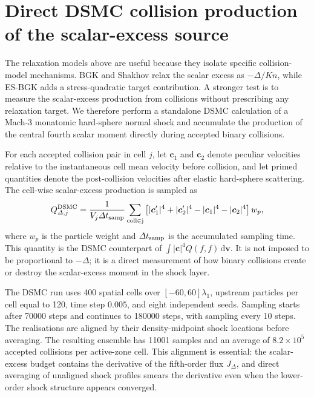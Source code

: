 \documentclass[lineno,paper]{JFM-FLM_Au}
\newcommand{\Kn}{\mathit{Kn}}
\newcommand{\dd}{\mathrm{d}}
\begin{document}
\section{Direct DSMC collision production of the scalar-excess source}
\label{sec:dsmc}

The relaxation models above are useful because they isolate specific collision-model mechanisms.  BGK and Shakhov relax the scalar excess as $-\Delta/\Kn$, while ES-BGK adds a stress-quadratic target contribution.  A stronger test is to measure the scalar-excess production from collisions without prescribing any relaxation target.  We therefore perform a standalone DSMC calculation of a Mach-3 monatomic hard-sphere normal shock and accumulate the production of the central fourth scalar moment directly during accepted binary collisions.

For each accepted collision pair in cell $j$, let $\boldsymbol c_1$ and $\boldsymbol c_2$ denote peculiar velocities relative to the instantaneous cell mean velocity before collision, and let primed quantities denote the post-collision velocities after elastic hard-sphere scattering.  The cell-wise scalar-excess production is sampled as
\begin{equation}
  Q_{\Delta,j}^{\rm DSMC}
  =\frac{1}{V_j\Delta t_{\rm samp}}
  \sum_{\rm coll\in j}
  \left[
  |\boldsymbol c'_1|^4+|\boldsymbol c'_2|^4
  -|\boldsymbol c_1|^4-|\boldsymbol c_2|^4
  \right]w_p,
  \label{eq:dsmc_qdelta}
\end{equation}
where $w_p$ is the particle weight and $\Delta t_{\rm samp}$ is the accumulated sampling time.  This quantity is the DSMC counterpart of $\int |\boldsymbol c|^4Q(f,f)\,\dd\boldsymbol v$.  It is not imposed to be proportional to $-\Delta$; it is a direct measurement of how binary collisions create or destroy the scalar-excess moment in the shock layer.

The DSMC run uses 400 spatial cells over $[-60,60]\lambda_1$, upstream particles per cell equal to 120, time step $0.005$, and eight independent seeds.  Sampling starts after 70000 steps and continues to 180000 steps, with sampling every 10 steps.  The realisations are aligned by their density-midpoint shock locations before averaging.  The resulting ensemble has 11001 samples and an average of $8.2\times10^5$ accepted collisions per active-zone cell.  This alignment is essential: the scalar-excess budget contains the derivative of the fifth-order flux $J_\Delta$, and direct averaging of unaligned shock profiles smears the derivative even when the lower-order shock structure appears converged.
\end{document}

